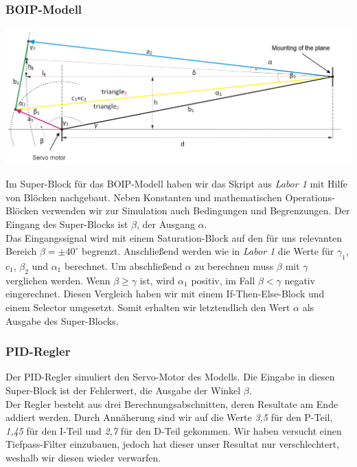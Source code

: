 \subsubsection{BOIP-Modell}
\begin{center}
	\begin{minipage}{\linewidth}
	\centering
	\includegraphics[scale=0.3]{images/figure1.png}
	\end{minipage}
\end{center}
Im Super-Block für das BOIP-Modell haben wir das Skript aus \textit{Labor 1} mit Hilfe von Blöcken nachgebaut. Neben Konstanten und mathematischen Operations-Blöcken verwenden wir zur Simulation auch Bedingungen und Begrenzungen. Der Eingang des Super-Blocks ist $\beta$, der Ausgang $\alpha$. \\
Das Eingangssignal wird mit einem Saturation-Block auf den für uns relevanten Bereich $\beta = \pm 40 ^\circ$ begrenzt. Anschließend werden wie in \textit{Labor 1} die Werte für $\gamma_1$, $c_1$, $\beta_2$ und $\alpha_1$ berechnet. Um abschließend $\alpha$ zu berechnen muss $\beta$ mit $\gamma$ verglichen werden. Wenn $\beta \geq \gamma$ ist, wird $\alpha_1$ positiv, im Fall $\beta < \gamma$ negativ eingerechnet. Diesen Vergleich haben wir mit einem If-Then-Else-Block und einem Selector umgesetzt. Somit erhalten wir letztendlich den Wert $\alpha$ als Ausgabe des Super-Blocks.

\subsubsection{PID-Regler}
Der PID-Regler simuliert den Servo-Motor des Modells. Die Eingabe in diesen Super-Block ist der Fehlerwert, die Ausgabe der Winkel $\beta$. \\
Der Regler besteht aus drei Berechnungsabschnitten, deren Resultate am Ende addiert werden. Durch Annäherung sind wir auf die Werte \textit{3,5} für den P-Teil, \textit{1,45} für den I-Teil und \textit{2,7} für den D-Teil gekommen. Wir haben versucht einen Tiefpass-Filter einzubauen, jedoch hat dieser unser Resultat nur verschlechtert, weshalb wir diesen wieder verwarfen.

